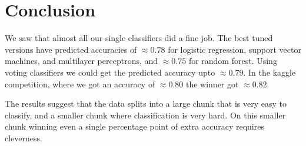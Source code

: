 \documentclass[parskip=half]{scrartcl}
\theoremstyle{definition}
\theoremstyle{remark}
\begin{document}
\section{Conclusion} \label{sec:conclusion}

We saw that almost all our single classifiers did a fine job.
The best tuned versions have predicted accuracies of $\approx 0.78$ for logistic regression, support vector machines, and multilayer perceptrons, and $\approx 0.75$ for random forest.
Using voting classifiers we could get the predicted accuracy upto $\approx 0.79$. 
In the kaggle competition, where we got an accuracy of $\approx 0.80$ the winner got $\approx 0.82$.

The results suggest that the data splits into a large chunk that is very easy to classify, and a smaller chunk where classification is very hard.
On this smaller chunk winning even a single percentage point of extra accuracy requires cleverness. 

\end{document}
